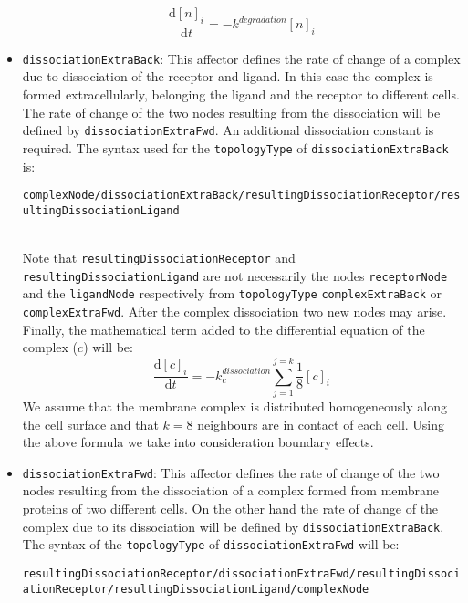 \documentclass[a4paper, 11pt]{article}
\begin{document}
\begin{itemize}
  \begin{equation}
    \frac{\mathrm{d}[n]_i}{\mathrm{d}t} = - k^{degradation}[n]_i
  \end{equation}
\item \texttt{dissociationExtraBack}: 
  This affector defines the rate of change of a complex due to dissociation of the receptor and ligand.
  In this case the complex is formed extracellularly, belonging the ligand and the receptor to different cells.
  The rate of change of the two nodes resulting from the dissociation will be defined by \texttt{dissociationExtraFwd}.
  An additional dissociation constant is required.
  The syntax used for the \texttt{topologyType} of \texttt{dissociationExtraBack} is:\\[1.5ex]
  \begin{footnotesize}
    \texttt{complexNode/dissociationExtraBack/resultingDissociationReceptor/resultingDissociationLigand}
  \end{footnotesize}\\[1.5ex]
  Note that \texttt{resultingDissociationReceptor} and \texttt{resultingDissociationLigand} are not necessarily the nodes \texttt{receptorNode} and the \texttt{ligandNode} respectively from \texttt{topologyType} \texttt{complexExtraBack} or \texttt{complexExtraFwd}.
  After the complex dissociation two new nodes may arise.
  Finally, the mathematical term added to the differential equation of the complex ($c$) will be:
  \begin{equation}
    \frac{\mathrm{d}[c]_i}{\mathrm{d}t} = - k^{dissociation}_c \sum_{j = 1}^{j = k} \frac{1}{8}[c]_i
  \end{equation}
  We assume that the membrane complex is distributed homogeneously along the cell surface and that $k=8$ neighbours are in contact of each cell.
  Using the above formula we take into consideration boundary effects.
\item \texttt{dissociationExtraFwd}: 
  This affector defines the rate of change of the two nodes resulting from the dissociation of a complex formed from membrane proteins of two different cells.
  On the other hand the rate of change of the complex due to its dissociation will be defined by \texttt{dissociationExtraBack}.
  The syntax of the \texttt{topologyType} of \texttt{dissociationExtraFwd} will be:\\[1.5ex]
  \begin{tiny}
    \texttt{resultingDissociationReceptor/dissociationExtraFwd/resultingDissociationReceptor/resultingDissociationLigand/complexNode}

\end{tiny}
\end{itemize}
\end{document}
